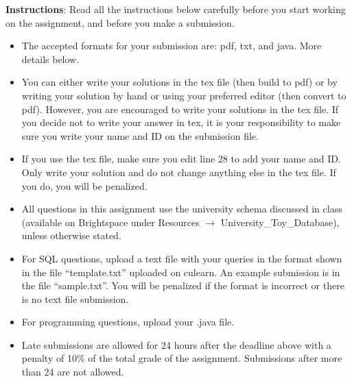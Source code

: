 \documentclass[a4 paper]{article}
\begin{document}
\textbf{Instructions}: Read all the instructions below carefully before you start working on the assignment, and before you make a submission.
\begin{itemize}
    \item The accepted formats for your submission are: pdf, txt, and java. More details below.
    \item You can either write your solutions in the tex file (then build to pdf) or by writing your solution by hand or using your preferred editor (then convert to pdf). However, you are encouraged to write your solutions in the tex file. If you decide not to write your answer in tex, it is your responsibility to make sure you write your name and ID on the submission file.
    \item If you use the tex file, make sure you edit line 28 to add your name and ID. Only write your solution and do not change anything else in the tex file. If you do, you will be penalized.
    \item All questions in this assignment use the university schema discussed in class (available on Brightspace under Resources $\rightarrow$ University\_Toy\_Database), unless otherwise stated.
    \item For SQL questions, upload a text file with your queries in the format shown in the file ``template.txt'' uploaded on culearn. An example submission is in the file ``sample.txt''. You will be penalized if the format is incorrect or there is no text file submission.
    \item For programming questions, upload your .java file.
    \item Late submissions are allowed for 24 hours after the deadline above with a penalty of 10\% of the total grade of the assignment. Submissions after more than 24 are not allowed.
\end{itemize}
\end{document}
